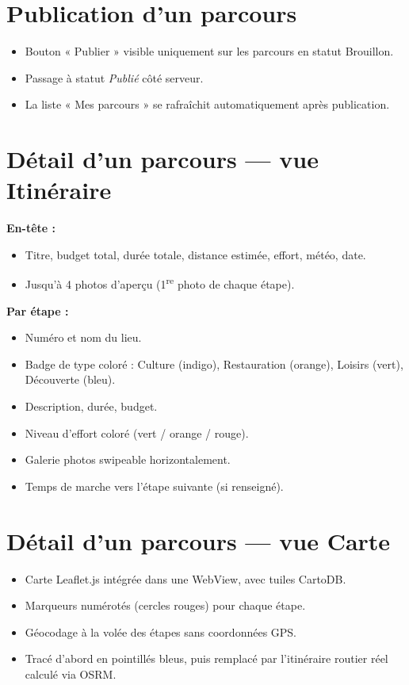 \documentclass[12pt, a4paper, openany]{report}
\begin{document}
\section{Publication d'un parcours}

\begin{itemize}
  \item Bouton « Publier » visible uniquement sur les parcours en statut Brouillon.
  \item Passage à statut \textit{Publié} côté serveur.
  \item La liste « Mes parcours » se rafraîchit automatiquement après publication.
\end{itemize}

\section{Détail d'un parcours --- vue Itinéraire}

\textbf{En-tête :}
\begin{itemize}
  \item Titre, budget total, durée totale, distance estimée, effort, météo, date.
  \item Jusqu'à 4 photos d'aperçu (1\textsuperscript{re} photo de chaque étape).
\end{itemize}

\textbf{Par étape :}
\begin{itemize}
  \item Numéro et nom du lieu.
  \item Badge de type coloré : Culture (indigo), Restauration (orange),
    Loisirs (vert), Découverte (bleu).
  \item Description, durée, budget.
  \item Niveau d'effort coloré (vert / orange / rouge).
  \item Galerie photos swipeable horizontalement.
  \item Temps de marche vers l'étape suivante (si renseigné).
\end{itemize}

\section{Détail d'un parcours --- vue Carte}

\begin{itemize}
  \item Carte Leaflet.js intégrée dans une WebView, avec tuiles CartoDB.
  \item Marqueurs numérotés (cercles rouges) pour chaque étape.
  \item Géocodage à la volée des étapes sans coordonnées GPS.
  \item Tracé d'abord en pointillés bleus, puis remplacé par l'itinéraire routier
    réel calculé via OSRM.
\end{itemize}
\end{document}
